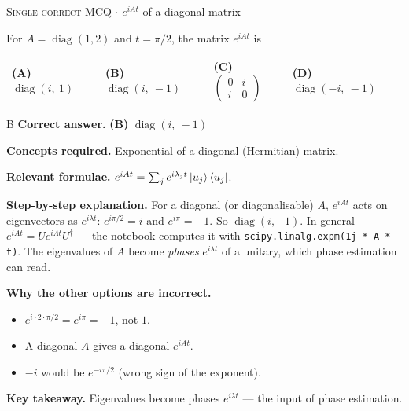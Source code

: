 \documentclass[11pt,a4paper]{article}
\newcommand{\optlabel}[1]{\textbf{(#1)}}
\newcommand{\correctlabel}[1]{\textcolor{okgreen}{\textbf{(#1)}\,\ding{51}}}
\newenvironment{qitem}[1]{\begin{list}{}{\setlength{\leftmargin}{3.3em}\setlength{\labelwidth}{3.1em}%
  \setlength{\labelsep}{0.2em}\setlength{\topsep}{3pt}\setlength{\parsep}{3pt}}\item[\textbf{Q.#1}\hfill]}{\end{list}}
\newcommand{\qsep}{\par\vspace{2pt}{\color{black!15}\hrule}\vspace{4pt}}
\newcommand{\qmeta}[2]{{\footnotesize\color{black!60}\textsc{#1} \;$\cdot$\; #2}\par}
\begin{document}
\begin{qitem}{16}
\qmeta{Single-correct MCQ}{$e^{iAt}$ of a diagonal matrix}
For $A = \operatorname{diag}(1, 2)$ and $t = \pi/2$, the matrix $e^{iAt}$ is
\par\smallskip\noindent\begin{tabularx}{\linewidth}{@{}*{4}{L}@{}}
\optlabel{A}\,$\operatorname{diag}(i,\ 1)$ & \correctlabel{B}\,$\operatorname{diag}(i,\ -1)$ & \optlabel{C}\,$\begin{pmatrix}0 & i\\ i & 0\end{pmatrix}$ & \optlabel{D}\,$\operatorname{diag}(-i,\ -1)$
\end{tabularx}
\end{qitem}
\begin{solbox}{B}
\textbf{\color{brand}Correct answer.} \textcolor{okgreen}{\textbf{(B)}} $\operatorname{diag}(i,\ -1)$

\textbf{\color{brand}Concepts required.} Exponential of a diagonal (Hermitian) matrix.

\textbf{\color{brand}Relevant formulae.} $e^{iAt} = \sum_je^{i\lambda_jt}\ket{u_j}\bra{u_j}$.

\textbf{\color{brand}Step-by-step explanation.} For a diagonal (or diagonalisable) $A$, $e^{iAt}$ acts on eigenvectors as $e^{i\lambda t}$: $e^{i\pi/2} = i$ and $e^{i\pi} = -1$. So $\operatorname{diag}(i, -1)$. In general
$e^{iAt} = Ue^{i\Lambda t}U^\dagger$ --- the notebook computes it with \texttt{scipy.linalg.expm(1j * A * t)}. The eigenvalues of $A$ become \emph{phases} $e^{i\lambda t}$ of
a unitary, which phase estimation can read.

\textbf{\color{brand}Why the other options are incorrect.}
\begin{itemize}[leftmargin=2.4em, itemsep=1pt, topsep=2pt]
\item[\textbf{(A)}] $e^{i\cdot2\cdot\pi/2} = e^{i\pi} = -1$, not $1$.
\item[\textbf{(C)}] A diagonal $A$ gives a diagonal $e^{iAt}$.
\item[\textbf{(D)}] $-i$ would be $e^{-i\pi/2}$ (wrong sign of the exponent).
\end{itemize}
\textbf{\color{brand}Key takeaway.} Eigenvalues become phases $e^{i\lambda t}$ --- the input of phase estimation.
\end{solbox}
\qsep
\end{document}
